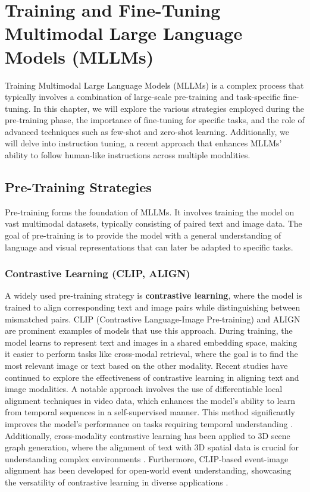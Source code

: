 \chapter{Training and Fine-Tuning Multimodal Large Language Models (MLLMs)}

Training Multimodal Large Language Models (MLLMs) is a complex process that typically involves a combination of large-scale pre-training and task-specific fine-tuning. In this chapter, we will explore the various strategies employed during the pre-training phase, the importance of fine-tuning for specific tasks, and the role of advanced techniques such as few-shot and zero-shot learning. Additionally, we will delve into instruction tuning, a recent approach that enhances MLLMs' ability to follow human-like instructions across multiple modalities.

\section{Pre-Training Strategies}

Pre-training forms the foundation of MLLMs. It involves training the model on vast multimodal datasets, typically consisting of paired text and image data. The goal of pre-training is to provide the model with a general understanding of language and visual representations that can later be adapted to specific tasks.

\subsection{Contrastive Learning (CLIP, ALIGN)}

A widely used pre-training strategy is \textbf{contrastive learning}, where the model is trained to align corresponding text and image pairs while distinguishing between mismatched pairs. CLIP (Contrastive Language-Image Pre-training) and ALIGN are prominent examples of models that use this approach. During training, the model learns to represent text and images in a shared embedding space, making it easier to perform tasks like cross-modal retrieval, where the goal is to find the most relevant image or text based on the other modality.
Recent studies have continued to explore the effectiveness of contrastive learning in aligning text and image modalities. A notable approach involves the use of differentiable local alignment techniques in video data, which enhances the model's ability to learn from temporal sequences in a self-supervised manner. This method significantly improves the model's performance on tasks requiring temporal understanding \cite{temporal_alignment_2024}. Additionally, cross-modality contrastive learning has been applied to 3D scene graph generation, where the alignment of text with 3D spatial data is crucial for understanding complex environments \cite{3d_scene_graph_2024}. Furthermore, CLIP-based event-image alignment has been developed for open-world event understanding, showcasing the versatility of contrastive learning in diverse applications \cite{event_image_alignment_2024}.

